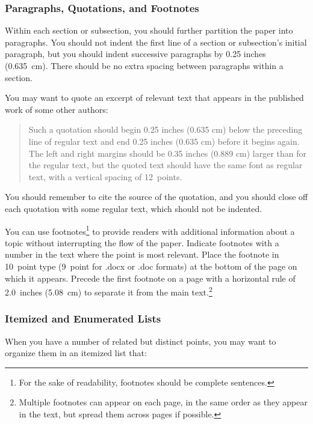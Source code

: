 \documentclass[11pt,letterpaper]{article}
\begin{document}
\subsubsection{Paragraphs, Quotations, and Footnotes}

Within each section or subsection, you should further partition 
the paper into paragraphs. You should not indent the first line 
of a section or subsection's initial paragraph, but you should
indent successive paragraphs by 0.25 inches (0.635~cm). There 
should be no extra spacing between paragraphs within a section. 
 
You may want to quote an excerpt of relevant text that appears in 
the published work of some other authors: 

\begin{quote}
Such a quotation should begin 0.25 inches (0.635 cm) below the preceding 
line of regular text and end 0.25 inches (0.635 cm) before it begins
again. The left and right margins should be 0.35 inches (0.889 cm) larger 
than for the regular text, but the quoted text should have the same
font as regular text, with a vertical spacing of 12~points.
\end{quote}

\noindent
You should remember to cite the source of the quotation, and you should 
close off each quotation with some regular text, which should not be
indented.

You can use footnotes\footnote{For the sake of readability, footnotes
should be complete sentences.} to provide readers with additional
information about a topic without interrupting the flow of the paper.
Indicate footnotes with a number in the text where the point is most
relevant. Place the footnote in 10~point type  
(9~point for .docx or .doc formats) at the bottom of the
page on which it appears. Precede the first footnote on a page 
with a horizontal rule of 2.0~inches (5.08~cm) to separate it from 
the main text.\footnote{Multiple footnotes can appear on each page, 
in the same order as they appear in the text, but spread them across
pages if possible.}

\subsubsection{Itemized and Enumerated Lists}

When you have a number of related but distinct points, you may want
to organize them in an itemized list that: 

\vskip 0.05in
\end{document}
